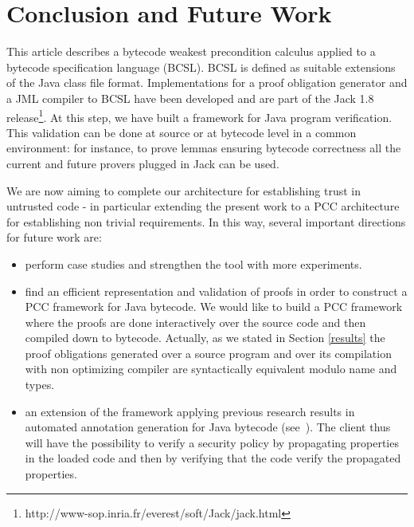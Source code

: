 \section{Conclusion and Future Work}\label{conclusion}
This article describes a bytecode weakest precondition calculus applied to a bytecode specification language (BCSL).
BCSL is defined as suitable extensions of the Java class file format.
Implementations for a proof obligation generator and a JML compiler to BCSL have been developed and are part of the Jack 1.8 release\footnote{http://www-sop.inria.fr/everest/soft/Jack/jack.html}.
At this step, we have built a framework for Java program verification.
 This validation can be done at source or at bytecode level in a common environment: for instance, to prove lemmas ensuring bytecode correctness all the current and future provers plugged in Jack can be used.

We are now aiming to complete our architecture for establishing trust in untrusted code - in particular extending the present work to a PCC architecture for establishing non trivial requirements.  
In this way, several important directions for future work are:
\begin{itemize}
\item perform case studies and strengthen the tool with more experiments.
\item find an efficient representation and validation of proofs in order to construct a PCC framework for Java bytecode.
 We would like to build a PCC framework where the proofs are done interactively over the source code
and then compiled down to bytecode. Actually, as we stated in Section \ref{results} the proof obligations generated over a source program and
 over its compilation with non optimizing compiler are syntactically equivalent modulo name and types. 
\item an extension of the framework applying previous research results in automated annotation generation for Java bytecode (see~\cite{PBBHL}). The client thus will have the possibility to verify a security policy by propagating properties in the loaded code and then by verifying that the code verify the propagated properties.

\end{itemize}

